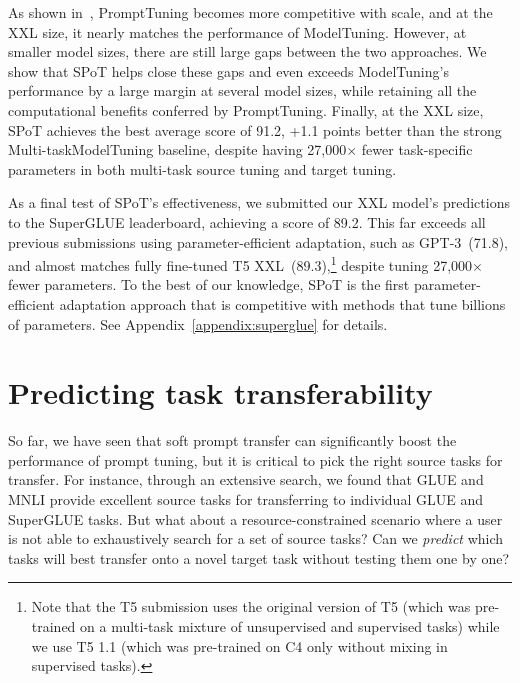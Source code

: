 As shown in~\citet{BLester21}, {\small \sc PromptTuning} becomes more competitive with scale, and at the {\small \sc XXL} size, it nearly matches the performance of {\small \sc ModelTuning}. However, at smaller model sizes, there are still large gaps between the two approaches. We show that {{\small \sc SPoT}} helps close these gaps and even exceeds {\small \sc ModelTuning}'s performance by a large margin at several model sizes, while retaining all the computational benefits conferred by {\small \sc PromptTuning}. Finally, at the {\small \sc XXL} size, {{\small \sc SPoT}} achieves the best average score of 91.2, +1.1 points better than the strong {\small \sc Multi-taskModelTuning} baseline, despite having 27,000$\times$ fewer task-specific parameters in both multi-task source tuning and target tuning.

As a final test of {{\small \sc SPoT}}'s effectiveness, we submitted our {\small \sc XXL} model's predictions to the {\small \sc SuperGLUE} leaderboard, achieving a score of 89.2. This far exceeds all previous submissions using parameter-efficient adaptation, such as {\small \sc \mbox{GPT-3}}~(71.8), and almost matches fully fine-tuned {\small \sc T5 XXL}~(89.3),\footnote{Note that the {\small \sc T5} submission uses the original version of {\small \sc T5} (which was pre-trained on a multi-task mixture of unsupervised and supervised tasks) while we use {\small \sc T5 1.1} (which was pre-trained on C4 only without mixing in supervised tasks).} despite tuning 27,000$\times$ fewer parameters. To the best of our knowledge, {{\small \sc SPoT}} is the first parameter-efficient adaptation approach that is competitive with methods that tune billions of parameters. See Appendix~\ref{appendix:superglue} for details. 

\section{Predicting task transferability}
\label{sec:task-specific_spot}

So far, we have seen that soft prompt transfer can significantly boost the performance of prompt tuning, but it is critical to pick the right source tasks for transfer. For instance, through an extensive search, we found that {\small \sc GLUE} and {\small \sc MNLI} provide excellent source tasks for transferring to individual {\small \sc GLUE} and {\small \sc SuperGLUE} tasks. But what about a resource-constrained scenario where a user is not able to exhaustively search for a set of source tasks? Can we \emph{predict} which tasks will best transfer onto a novel target task without testing them one by one?

